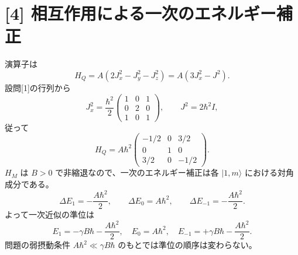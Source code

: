 \documentclass[11pt,a4paper]{article}
\begin{document}
\section*{[4] 相互作用による一次のエネルギー補正}
演算子は
\begin{equation}
  H_Q=A(2J_x^2-J_y^2-J_z^2)=A(3J_x^2-J^2).
\end{equation}
設問[1]の行列から
\begin{equation}
  J_x^2=\frac{\hbar^2}{2}
  \begin{pmatrix}1&0&1\\0&2&0\\1&0&1\end{pmatrix},\qquad
  J^2=2\hbar^2 I,
\end{equation}
従って
\begin{equation}
  H_Q=A\hbar^2
  \begin{pmatrix}-1/2&0&3/2\\0&1&0\\3/2&0&-1/2\end{pmatrix}.
\end{equation}
$H_M$ は $B>0$ で非縮退なので、一次のエネルギー補正は各 $|1,m\rangle$ における対角成分である。
\begin{equation}
  \Delta E_{1}= -\frac{A\hbar^2}{2},\qquad
  \Delta E_{0}= A\hbar^2,\qquad
  \Delta E_{-1}= -\frac{A\hbar^2}{2}.
\end{equation}
よって一次近似の準位は
\begin{equation}
  \boxed{E_{1}=-\gamma B\hbar-\frac{A\hbar^2}{2},\quad
  E_{0}=A\hbar^2,\quad
  E_{-1}=+\gamma B\hbar-\frac{A\hbar^2}{2}.}
\end{equation}
問題の弱摂動条件 $A\hbar^2\ll\gamma B\hbar$ のもとでは準位の順序は変わらない。
\end{document}
